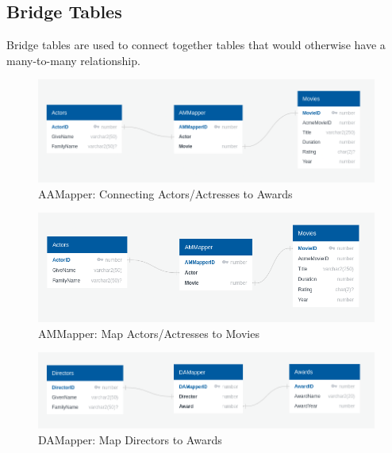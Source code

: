 \documentclass[letterpaper,12pt]{article}
\begin{document}
\subsection{Bridge Tables}
Bridge tables are used to connect together tables that would otherwise have a many-to-many relationship.
\begin{figure}[H]
    \centering
    \caption{AAMapper: Connecting Actors/Actresses to Awards}
    \label{fig:AAMapper}
    \includegraphics[width=1.0\linewidth]{AAMapper - Actors - Awards.png}
\end{figure}
\begin{figure}[H]
    \centering
    \caption{AMMapper: Map Actors/Actresses to Movies}
    \label{fig:AMMapper}
    \includegraphics[width=1.0\linewidth]{"AMMapper - Actors - Movies.png"}
\end{figure}
\begin{figure}[H]
    \centering
    \caption{DAMapper: Map Directors to Awards}
    \label{fig:DAMapper}
    \includegraphics[width=1.0\linewidth]{"DAMapper - Directors - Awards.png"}
\end{figure}
\end{document}
